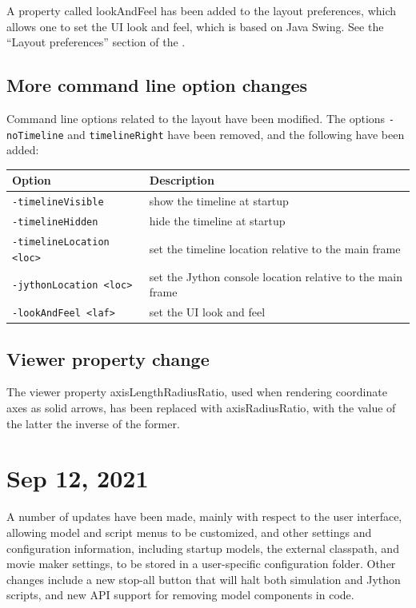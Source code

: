 \documentclass{article}
\begin{document}
A property called {\sf lookAndFeel} has been added to the layout
preferences, which allows one to set the UI look and feel, which is
based on Java Swing. See the ``Layout preferences'' section of the
.

\subsection*{More command line option changes}

Command line options related to the layout have been modified.  The
options {\tt -noTimeline} and {\tt timelineRight} have been removed,
and the following have been added:

\begin{center}
\begin{tabular}{|ll|}
\hline
Option & Description \\
\hline
{\tt -timelineVisible} & show the timeline at startup\\
{\tt -timelineHidden} & hide the timeline at startup\\
{\tt -timelineLocation <loc>} &
set the timeline location relative to the main frame\\
{\tt -jythonLocation <loc>} & 
set the Jython console location relative to the main frame\\
{\tt -lookAndFeel <laf>} & 
set the UI look and feel\\
\hline
\end{tabular}
\end{center}

\subsection*{Viewer property change}

The viewer property {\sf axisLengthRadiusRatio}, used when rendering
coordinate axes as solid arrows, has been replaced with {\sf
axisRadiusRatio}, with the value of the latter the inverse of the
former.

\section*{Sep 12, 2021}

A number of updates have been made, mainly with respect to the user
interface, allowing model and script menus to be customized, and other
settings and configuration information, including startup models, the
external classpath, and movie maker settings, to be stored in a
user-specific configuration folder. Other changes include a new
stop-all button that will halt both simulation and Jython scripts, and
new API support for removing model components in code.
\end{document}
